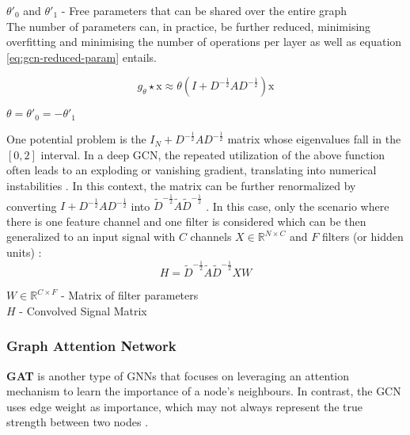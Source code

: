 \documentclass[11pt,a4paper]{article}
\begin{document}
 $\theta'_0$ and $\theta'_1$ - Free parameters that can be shared over the entire graph \\


The number of parameters can, in practice, be further reduced, minimising overfitting and minimising the number of operations per layer as well \cite{tangGraphNeuralNetworks2022} as equation \ref{eq:gcn-reduced-param} entails.

\begin{equation} \label{eq:gcn-reduced-param}
g_\theta \star \text{x} \approx \theta (I + D^{-\frac{1}{2}} AD^{-\frac{1}{2}}) \text{x}
\end{equation}
 
$\theta = \theta'_0 = - \theta'_1$

One potential problem is the $I_N + D^{-\frac{1}{2}} AD^{-\frac{1}{2}}$ matrix whose eigenvalues fall in the $[0,2]$ interval. In a deep GCN, the repeated utilization of the above function often leads to an exploding or vanishing gradient, translating into numerical instabilities \cite{liuIntroductionGraphNeural2020, tangGraphNeuralNetworks2022}. In this context, the matrix can be further renormalized by converting $I + D^{-\frac{1}{2}} AD^{-\frac{1}{2}}$ into $\tilde{D}^{-\frac{1}{2}} \tilde{A}\tilde{D}^{-\frac{1}{2}}$ \cite{liuIntroductionGraphNeural2020, tangGraphNeuralNetworks2022}. 
In this case, only the scenario where there is one feature channel and one filter is considered which can be then generalized to an input signal with $C$ channels $X \in \mathbb{R}^{N \times C}$ and $F$ filters (or hidden units) \cite{liuIntroductionGraphNeural2020, tangGraphNeuralNetworks2022}:
\begin{equation}
H = \tilde{D}^{-\frac{1}{2}} \tilde{A}\tilde{D}^{-\frac{1}{2}}XW    
\end{equation}

$W \in \mathbb{R}^{C \times F}$ - Matrix of filter parameters \\
$H$ - Convolved Signal Matrix \\


\subsubsection{Graph Attention Network}

\textbf{\ac{GAT}} \cite{velickovicGraphAttentionNetworks2018} is another type of \acp{GNN} that focuses on leveraging an attention mechanism to learn the importance of a node's neighbours. In contrast, the \ac{GCN} uses edge weight as importance, which may not always represent the true strength between two nodes \cite{tangGraphNeuralNetworks2022, velickovicGraphAttentionNetworks2018}.
\end{document}
